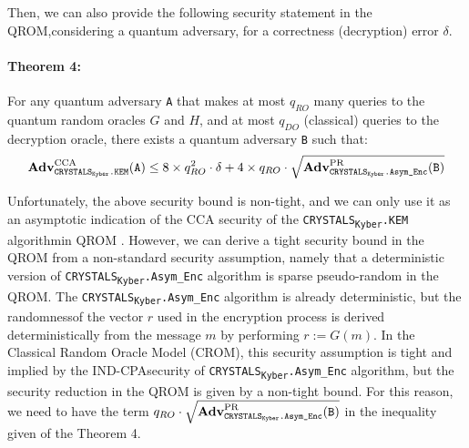 \documentclass[runningheads]{llncs}
\numberwithin{equation}{section}
\begin{document}
    \vspace{2ex}
    
    \noindent Then, we can also provide the following security statement in the QROM,\break considering a quantum adversary, for a correctness (decryption) error $\delta$.
    \paragraph{\textbf{Theorem 4:}} For any quantum adversary \texttt{A} that makes at most ${q}_{RO}$ many queries to the quantum random oracles $G$ and $H$, and at most ${q}_{DO}$ (classical) queries to the decryption oracle, there exists a quantum adversary \texttt{B} such that:
    $$ {\text{\textbf{Adv}}}_{{\text{\texttt{CRYSTALS}\textsubscript{\texttt{Kyber}}\texttt{.KEM}}}}^{\text{CCA}}\text{(\texttt{A})} \leq 8 \times {q}_{RO}^{2} \cdot \delta + 4 \times {q}_{RO} \cdot \sqrt{ {\text{\textbf{Adv}}}_{{\text{\texttt{CRYSTALS}\textsubscript{\texttt{Kyber}}\texttt{.Asym\_Enc}}}}^{\text{PR}}\text{(\texttt{B})} } $$

    \vspace{2ex}
    \noindent Unfortunately, the above security bound is non-tight, and we can only use it as an asymptotic indication of the CCA security of the \texorpdfstring{\texttt{CRYSTALS}\textsubscript{\texttt{Kyber}}\texttt{.KEM}}\/ algorithm\break in QROM \cite{saito-xagawa-yamakawa:tightly-secure-key-encapsulation-mechanism-quantum-random-oracle-model:2017:06-2024}. However, we can derive a tight security bound in the QROM from a non-standard security assumption, namely that a deterministic version of \texorpdfstring{\texttt{CRYSTALS}\textsubscript{\texttt{Kyber}}\texttt{.Asym\_Enc}}\/ algorithm is sparse pseudo-random in the QROM. The \texorpdfstring{\texttt{CRYSTALS}\textsubscript{\texttt{Kyber}}\texttt{.Asym\_Enc}}\/ algorithm is already deterministic, but the randomness\break of the vector $r$ used in the encryption process is derived deterministically from the message $m$ by performing $r := G(m)$. In the Classical Random Oracle Model (CROM), this security assumption is tight and implied by the IND-CPA\break security of \texorpdfstring{\texttt{CRYSTALS}\textsubscript{\texttt{Kyber}}\texttt{.Asym\_Enc}}\/ algorithm, but the security reduction in the QROM is given by a non-tight bound. For this reason, we need to have the term ${q}_{RO} \cdot \sqrt{ {\text{\textbf{Adv}}}_{{\text{\texttt{CRYSTALS}\textsubscript{\texttt{Kyber}}\texttt{.Asym\_Enc}}}}^{\text{PR}}\text{(\texttt{B})} }$ in the inequality given of the Theorem 4.
\end{document}
